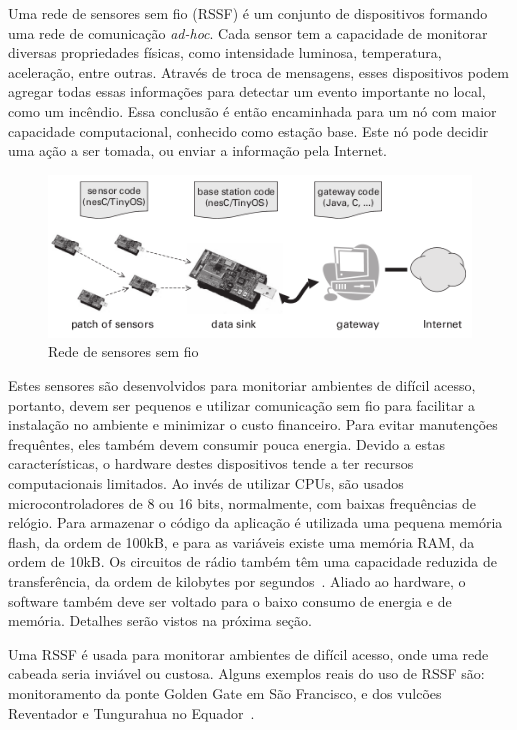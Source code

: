 Uma rede de sensores sem fio (RSSF) é um conjunto de dispositivos formando uma rede de comunicação \textit{ad-hoc}. Cada
sensor tem a capacidade de monitorar diversas propriedades físicas, como intensidade luminosa, temperatura, aceleração,
entre outras. Através de troca de mensagens, esses dispositivos podem agregar todas essas informações para detectar um evento
importante no local, como um incêndio. Essa conclusão é então encaminhada para um nó com maior capacidade computacional,
conhecido como estação base. Este nó pode decidir uma ação a ser tomada, ou enviar a informação pela Internet.

\begin{figure}
\centering
\includegraphics[scale=0.7]{images/sensores-e-topologia.png}
\caption{Rede de sensores sem fio}
\end{figure}

Estes sensores são desenvolvidos para monitoriar ambientes de difícil acesso, portanto, devem ser pequenos e utilizar
comunicação sem fio para facilitar a instalação no ambiente e minimizar o custo financeiro. Para evitar manutenções
frequêntes, eles também devem consumir pouca energia. Devido a estas características, o hardware destes dispositivos 
tende a ter recursos computacionais limitados. Ao invés de utilizar CPUs, são usados microcontroladores de 8 ou 16 bits, 
normalmente, com baixas frequências de relógio. Para armazenar o código da aplicação é utilizada uma pequena memória flash, 
da ordem de 100kB, e para as variáveis existe uma memória RAM, da ordem de 10kB. Os circuitos de rádio também têm uma 
capacidade reduzida de transferência, da ordem de kilobytes por segundos~\cite{LevisGay/09}.
Aliado ao hardware, o software também deve ser voltado para o baixo consumo de energia e de memória. Detalhes serão
vistos na próxima seção. 

Uma RSSF é usada para monitorar ambientes de difícil acesso, onde uma rede cabeada seria inviável ou custosa.
Alguns exemplos reais do uso de RSSF são: monitoramento da ponte Golden Gate em São Francisco, e dos vulcões Reventador e 
Tungurahua no Equador~\cite{LevisGay/09}. 

